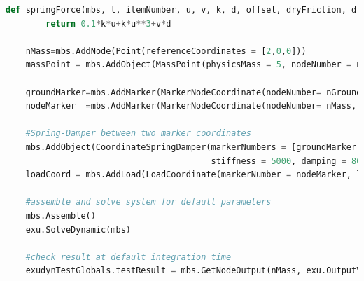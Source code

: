 \begin{lstlisting}[language=Python, firstnumber=1]
    def springForce(mbs, t, itemNumber, u, v, k, d, offset, dryFriction, dryFrictionProportionalZone):
        return 0.1*k*u+k*u**3+v*d

    nMass=mbs.AddNode(Point(referenceCoordinates = [2,0,0]))
    massPoint = mbs.AddObject(MassPoint(physicsMass = 5, nodeNumber = nMass))
    
    groundMarker=mbs.AddMarker(MarkerNodeCoordinate(nodeNumber= nGround, coordinate = 0))
    nodeMarker  =mbs.AddMarker(MarkerNodeCoordinate(nodeNumber= nMass, coordinate = 0))
    
    #Spring-Damper between two marker coordinates
    mbs.AddObject(CoordinateSpringDamper(markerNumbers = [groundMarker, nodeMarker], 
                                         stiffness = 5000, damping = 80, springForceUserFunction = springForce)) 
    loadCoord = mbs.AddLoad(LoadCoordinate(markerNumber = nodeMarker, load = 1)) #static linear solution:0.002

    #assemble and solve system for default parameters
    mbs.Assemble()
    exu.SolveDynamic(mbs)

    #check result at default integration time
    exudynTestGlobals.testResult = mbs.GetNodeOutput(nMass, exu.OutputVariableType.Displacement)[0]

\end{lstlisting}

